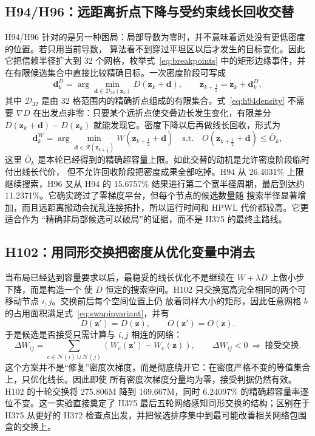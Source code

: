 \documentclass[UTF8,a4paper,11pt]{ctexrep}
\begin{document}
\subsection{H94/H96：远距离折点下降与受约束线长回收交替}
H94/H96 针对的是另一种困局：局部导数为零时，并不意味着远处没有更低密度的位置。若只用当前导数，
算法看不到穿过平坦区以后才发生的目标变化。因此它把信赖半径扩大到 32 个网格，枚举式~\eqref{eq:breakpoints}
中的矩形边缘事件，并在有限候选集合中直接比较精确目标。一次密度阶段可写成
\begin{equation}
\bm d_k^{D}=\arg\min_{\bm d\in\mathcal D_{32}(\bm z_k)}
 D(\bm z_k+\bm d),\qquad
 \bm z_{k+\frac12}=\bm z_k+\bm d_k^{D},
\label{eq:h94density}
\end{equation}
其中 $\mathcal D_{32}$ 是由 32 格范围内的精确折点组成的有限集合。式~\eqref{eq:h94density} 不需要
$\nabla D$ 在出发点非零：只要某个远折点使交叠边长发生变化，有限差分
$D(\bm z_k+\bm d)-D(\bm z_k)$ 就能发现它。密度下降以后再做线长回收，形式为
\begin{equation}
\bm d_k^{W}=\arg\min_{\bm d\in\mathcal R(\bm z_{k+\frac12})}
 W(\bm z_{k+\frac12}+\bm d)
\quad\text{s.t.}\quad
O(\bm z_{k+\frac12}+\bm d)\leq \bar O_k,
\label{eq:h94recover}
\end{equation}
这里 $\bar O_k$ 是本轮已经得到的精确超容量上限。如此交替的动机是允许密度阶段临时付出线长代价，
但不允许回收阶段把密度成果全部吃掉。H94 从 26.4031\% 上限继续搜索，H96 又从 H94 的 15.6757\%
结果进行第二个宽半径周期，最后到达约 11.2371\%。它确实跨过了零梯度平台，但每个节点的候选数量随
搜索半径显著增加，而且远距离搬动会扰乱连接拓扑，所以运行时间和 HPWL 代价都较高。它更适合作为
“精确非局部候选可以破局”的证据，而不是 H375 的最终主路线。

\subsection{H102：用同形交换把密度从优化变量中消去}
当布局已经达到容量要求以后，最稳妥的线长优化不是继续在 $W+\lambda D$ 上做小步下降，而是构造一个
使 $D$ 恒定的搜索空间。H102 只交换宽高完全相同的两个可移动节点 $i,j$。交换前后每个空间位置上仍
放着同样大小的矩形，因此任意网格 $b$ 的占用面积满足式~\eqref{eq:swapinvariant}，并有
\begin{equation}
D(\bm z')=D(\bm z),\qquad O(\bm z')=O(\bm z).
\label{eq:h102invariant}
\end{equation}
于是候选是否接受只需计算与 $i,j$ 相连的网络：
\begin{equation}
\Delta W_{ij}=\sum_{e\in\mathcal N(i)\cup\mathcal N(j)}
\left(W_e(\bm z')-W_e(\bm z)\right),\qquad
\Delta W_{ij}<0\ \Longrightarrow\ \text{接受交换}.
\label{eq:h102accept}
\end{equation}
这个方案并不是“修复”密度次梯度，而是彻底绕开它：在密度严格不变的等值集合上，只优化线长。因此即使
所有密度次梯度分量均为零，接受判据仍然有效。H102 的十轮交换将 275.806M 降到 169.667M，同时
6.24097\% 的精确超容量率逐位不变。这一实验直接奠定了 H375 最后五轮网络感知同形交换的结构；区别在于
H375 从更好的 H372 检查点出发，并把候选排序集中到最可能改善相关网络包围盒的交换上。
\end{document}
